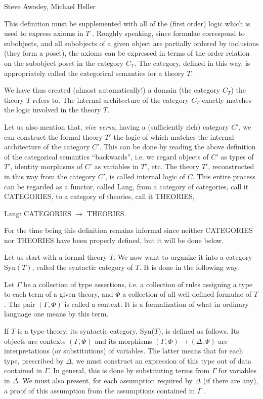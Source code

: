 \begin{artengenv2auth}{Steve Awodey, Michael Heller}
\begin{enumerate}
\end{enumerate}
This definition must be supplemented with all of the (first order) logic which is used to express axioms in $T$ \parencite[for details see][]{nLab2}. Roughly speaking, since formulae correspond to subobjects, and all subobjects of a given object are partially ordered by inclusions (they form a poset), the axioms can be expressed in terms of the order relation on the subobject poset in the category $C_T$.
The category, defined in this way, is appropriately called the categorical semantics for a theory $T$.

We have thus created (almost automatically!) a domain (the category $C_T$) the theory $T$ refers to. The internal architecture of the category $C_T$ exactly matches the logic involved in the theory $T$. 

Let us also mention that, \textit{vice versa}, having a (sufficiently rich) category $C'$, we can construct the formal theory $T'$ the logic of which matches the internal architecture of the category $C'$. This can be done by reading the above definition of the categorical semantics ``backwards'', i.e. we regard objects of $C'$ as types of $T'$, identity morphisms of $C'$ as variables in $T'$, etc. The theory $T'$, reconstructed in this way from the category $C'$, is called internal logic of $C$. This entire process can be regarded as a functor, called Lang, from a category of categories, call it CATEGORIES, to a category of theories, call it THEORIES,
\begin{center}
Lang: CATEGORIES $\to $ THEORIES.
\end{center}
For the time being this definition remains informal since neither CATEGORIES nor THEORIES have been properly defined, but it will be done below. 

Let us start with a formal theory $T$. We now want to organize it into a category Syn$(T)$, called the syntactic category of $T$. It is done in the following way.

Let $\Gamma $ be a collection of type assertions, i.e. a collection of rules assigning a type to each term of a given theory, and $\Phi $ a collection of all well-defined formulae of $T$. The pair $(\Gamma , \Phi )$ is called a context. It is a formalization of what in ordinary language one means by this term.

If $T$ is a type theory, its syntactic category, Syn($T$), is defined as follows. Its objects are contexts $(\Gamma , \Phi )$ and its morphisms $(\Gamma , \Phi ) \to (\Delta , \Psi )$ are interpretations (or substitutions) of variables. The latter means that for each type, prescribed by $\Delta $, we must construct an expression of this type out of data contained in $\Gamma $. In general, this is done by substituting terms from $\Gamma $ for variables in $\Delta $. We must also present, for each assumption required by $\Delta $ (if there are any), a proof of this assumption from the assumptions contained in $\Gamma $ \parencite[for details see][]{Fu,nLabSyn}. 


\end{artengenv2auth}
